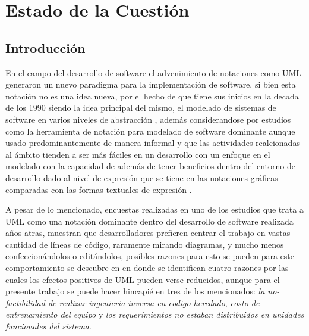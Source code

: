 \chapter{Estado de la Cuestión}%
\label{sec:estadodelacuestion}

\section{Introducción}
\label{sec:problematica}
En el campo del desarrollo de software el advenimiento de notaciones como UML
generaron un nuevo paradigma para la implementación de software, si bien esta
notación no es una idea nueva, por el hecho de que tiene sus inicios en la decada de los
1990 siendo la idea principal del mismo, el modelado de sistemas de software en
varios niveles de abstracción  \cite{chaudron2017}, además considerandose por
estudios como la herramienta de notación para modelado de software dominante
\cite{aldaeej2016} aunque usado predominantemente de manera informal y que las
actividades realcionadas al ámbito tienden a ser
más fáciles en un desarrollo con un enfoque en el modelado \cite{forward2010}
con la capacidad de además de tener beneficios dentro del entorno de desarrollo
dado al nivel de expresión que se tiene en las
notaciones gráficas comparadas con las formas textuales de expresión
\cite{rumpe2004}.

A pesar de lo mencionado, encuestas realizadas en uno de los estudios que trata
a UML como una notación dominante dentro del desarrollo de software realizada años
atras, muestran que desarrolladores prefieren centrar el trabajo en vastas
cantidad de líneas de código, raramente mirando diagramas, y mucho menos
confeccionándolos o editándolos, posibles razones para esto se pueden para este
comportamiento se descubre en \cite{bente2006} en donde se identifican cuatro
razones por las cuales los efectos positivos de UML pueden verse reducidos,
aunque para el presente trabajo se puede hacer hincapié en tres de los
mencionados:
\textit{la no-factibilidad de realizar ingenieria inversa en codigo heredado},
\textit{costo de entrenamiento del equipo} y \textit{los requerimientos no
estaban distribuidos en unidades funcionales del sistema}.


